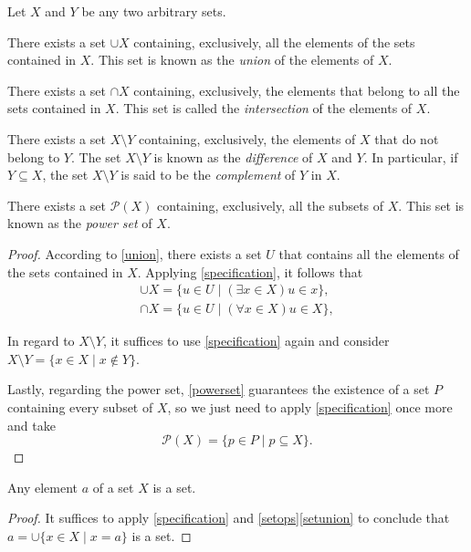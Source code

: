 \begin{para}
\label{setops}
Let $X$ and $Y$ be any two arbitrary sets.
\begin{statements}
\item \label{setunion} There exists a set $\cup X$ containing, exclusively, all the elements of the sets contained in $X$. This set is known as the \emph{union} of the elements of $X$.
\item There exists a set $\cap X$ containing, exclusively, the elements that belong to all the sets contained in $X$. This set is called the \emph{intersection} of the elements of $X$.
\item There exists a set $X\setminus Y$ containing, exclusively, the elements of $X$ that do not belong to $Y$. The set $X\setminus Y$ is known as the \emph{difference} of $X$ and $Y$. In particular, if $Y\subseteq X$, the set $X\setminus Y$ is said to be the \emph{complement} of $Y$ in $X$.
\item There exists a set $\mathcal{P}(X)$ containing, exclusively, all the subsets of $X$. This set is known as the \emph{power set} of $X$.
\end{statements}
\label{<+label+>}
\end{para}

\begin{proof}
According to \ref{union}, there exists a set $U$ that contains all the elements of the sets contained in $X$. Applying \ref{specification}, it follows that
\begin{gather*}
\cup X = \{u \in U \mid (\exists x \in X) u \in x\},\\
\cap X = \{u \in U \mid (\forall x \in X) u \in X\},
\end{gather*}

In regard to $X\setminus Y$, it suffices to use \ref{specification} again and consider $X\setminus Y = \{x\in X \mid x\not\in Y\}$.

Lastly, regarding the power set, \ref{powerset} guarantees the existence of a set $P$ containing every subset of $X$, so we just need to apply \ref{specification} once more and take
\[\mathcal{P}(X) = \{p \in P \mid p \subseteq X\}.\]
\end{proof}

\begin{proposition}
Any element $a$ of a set $X$ is a set.
\label{elisset}
\end{proposition}

\begin{proof}
It suffices to apply \ref{specification} and \ref{setops}\ref{setunion} to conclude that $a = \cup \{x \in X \mid x = a\}$ is a set.
\end{proof}


